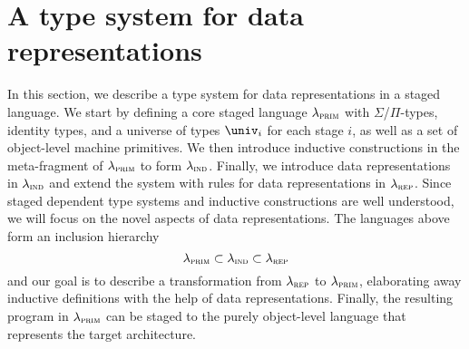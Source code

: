 \newcommand{\lambdaprim}{\lambda_{\textsc{prim}}}
\newcommand{\lambdaind}{\lambda_{\textsc{ind}}}
\newcommand{\lambdarep}{\lambda_{\textsc{rep}}}

\newcommand{\lab}[1]{{\ensuremath{\color{blue}{\mathsf{#1}}}}}
\newcommand{\kwd}[1]{\mta{\myuline{#1}}}
\newcommand{\Sdata}[2]{\kwd{data} \ \lab{#1} \, {#2} : \univ_1}
\newcommand{\Sctor}[4]{\kwd{ctor} \ \lab{#1} \, {#2} : \lab{#3}\, {#4}}
\newcommand{\Sctorvar}[4]{\kwd{ctor} \ #1 \, {#2} : \lab{#3}\, {#4}}
\newcommand{\Sfun}[3]{\kwd{fun} \ \lab{#1} : {#2} = {#3}}
\newcommand{\Srepr}[4]{\kwd{repr} \ \lab{#2}\, {#3}\ \kwd{as}\ {#4}}
\newcommand{\Sreprconst}[3]{\kwd{repr} \ \lab{#2}\ \kwd{as}\ {#3}}
\newcommand{\Sreprvar}[4]{\kwd{repr} \ {#2}\, {#3}\ \kwd{as}\ {#4}}
\newcommand{\Sclosed}[2]{\kwd{closed}\ #1 \ #2}
\newcommand{\DeltaFor}[1]{\Delta_{\lab{#1}}}
\newcommand{\Trepr}[1]{\mta{repr}\, {#1}}
\newcommand{\TRepr}[1]{\mta{Repr}\, {#1}}
\newcommand{\isLabNotIn}[2]{\lab{#1}\ \inte{label} \notin {#2}}
\newcommand{\caselab}[1]{\lab{\textrm{case}_{#1}}}

\section{A type system for data representations}\label{sec:type-system}

In this section, we describe a type system for data representations in a staged
language. We start by defining a core staged language $\lambdaprim$ with
$\Sigma$/$\Pi$-types, identity types, and a universe of types $\univ_i$ for
each stage $i$, as well as a set of object-level machine primitives. We then
introduce inductive constructions in the meta-fragment of $\lambdaprim$ to form
$\lambdaind$. Finally, we introduce data representations in $\lambdaind$ and
extend the system with rules for data representations in $\lambdarep$. Since
staged dependent type systems and inductive constructions are well understood,
we will focus on the novel aspects of data representations. The languages above
form an inclusion hierarchy
\[
  \lambdaprim \subset \lambdaind \subset \lambdarep
\]
and our goal is to describe a transformation from $\lambdarep$ to
$\lambdaprim$, elaborating away inductive definitions with the help of data
representations. Finally, the resulting program in $\lambdaprim$ can be staged
to the purely object-level language that represents the target architecture.

